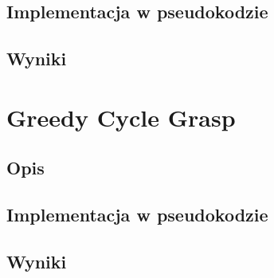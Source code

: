 \documentclass[a4paper 10pt]{article}
\begin{document}
\subsection{Implementacja w pseudokodzie}
\subsection{Wyniki}

\section{Greedy Cycle Grasp}
\subsection{Opis}
\subsection{Implementacja w pseudokodzie}
\subsection{Wyniki}
\end{document}
